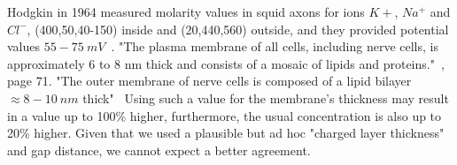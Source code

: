 \noindent

Hodgkin in 1964 measured molarity values in squid axons for ions $K+$, $Na^+$ and $Cl^-$, (400,50,40-150) inside and (20,440,560) outside, and they provided potential values 
$55-75~mV$~\cite{JohnstonWuNeurophysiology:1995}.
"The plasma
membrane of all cells, including nerve cells, is approximately 6 to 8 nm thick and consists of a mosaic of lipids
and proteins."~\cite{PrinciplesNeuralScience:2013}, page 71.
"The outer membrane of nerve cells is composed of a lipid
bilayer $\approx 8-10~nm$ thick"~\cite{MembraneCapacitance:2000}
Using such a value for the membrane's thickness may result in a value  up to 100\% higher, furthermore, the usual concentration is 
also up to 20\% higher.
Given that we used a plausible but ad hoc "charged layer thickness"
and gap distance, we cannot expect a better agreement.


%
%


